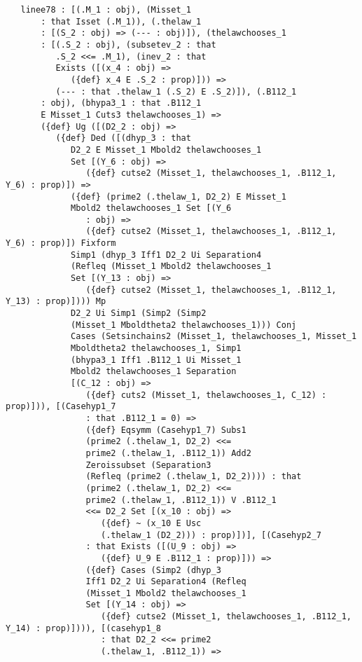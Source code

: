 \documentclass[12pt]{article}
\begin{document}
\begin{verbatim}
   linee78 : [(.M_1 : obj), (Misset_1 
       : that Isset (.M_1)), (.thelaw_1 
       : [(S_2 : obj) => (--- : obj)]), (thelawchooses_1 
       : [(.S_2 : obj), (subsetev_2 : that 
          .S_2 <<= .M_1), (inev_2 : that 
          Exists ([(x_4 : obj) => 
             ({def} x_4 E .S_2 : prop)])) => 
          (--- : that .thelaw_1 (.S_2) E .S_2)]), (.B112_1 
       : obj), (bhypa3_1 : that .B112_1 
       E Misset_1 Cuts3 thelawchooses_1) => 
       ({def} Ug ([(D2_2 : obj) => 
          ({def} Ded ([(dhyp_3 : that 
             D2_2 E Misset_1 Mbold2 thelawchooses_1 
             Set [(Y_6 : obj) => 
                ({def} cutse2 (Misset_1, thelawchooses_1, .B112_1, Y_6) : prop)]) => 
             ({def} (prime2 (.thelaw_1, D2_2) E Misset_1 
             Mbold2 thelawchooses_1 Set [(Y_6 
                : obj) => 
                ({def} cutse2 (Misset_1, thelawchooses_1, .B112_1, Y_6) : prop)]) Fixform 
             Simp1 (dhyp_3 Iff1 D2_2 Ui Separation4 
             (Refleq (Misset_1 Mbold2 thelawchooses_1 
             Set [(Y_13 : obj) => 
                ({def} cutse2 (Misset_1, thelawchooses_1, .B112_1, Y_13) : prop)]))) Mp 
             D2_2 Ui Simp1 (Simp2 (Simp2 
             (Misset_1 Mboldtheta2 thelawchooses_1))) Conj 
             Cases (Setsinchains2 (Misset_1, thelawchooses_1, Misset_1 
             Mboldtheta2 thelawchooses_1, Simp1 
             (bhypa3_1 Iff1 .B112_1 Ui Misset_1 
             Mbold2 thelawchooses_1 Separation 
             [(C_12 : obj) => 
                ({def} cuts2 (Misset_1, thelawchooses_1, C_12) : prop)])), [(Casehyp1_7 
                : that .B112_1 = 0) => 
                ({def} Eqsymm (Casehyp1_7) Subs1 
                (prime2 (.thelaw_1, D2_2) <<= 
                prime2 (.thelaw_1, .B112_1)) Add2 
                Zeroissubset (Separation3 
                (Refleq (prime2 (.thelaw_1, D2_2)))) : that 
                (prime2 (.thelaw_1, D2_2) <<= 
                prime2 (.thelaw_1, .B112_1)) V .B112_1 
                <<= D2_2 Set [(x_10 : obj) => 
                   ({def} ~ (x_10 E Usc 
                   (.thelaw_1 (D2_2))) : prop)])], [(Casehyp2_7 
                : that Exists ([(U_9 : obj) => 
                   ({def} U_9 E .B112_1 : prop)])) => 
                ({def} Cases (Simp2 (dhyp_3 
                Iff1 D2_2 Ui Separation4 (Refleq 
                (Misset_1 Mbold2 thelawchooses_1 
                Set [(Y_14 : obj) => 
                   ({def} cutse2 (Misset_1, thelawchooses_1, .B112_1, Y_14) : prop)]))), [(casehyp1_8 
                   : that D2_2 <<= prime2 
                   (.thelaw_1, .B112_1)) => 

\end{verbatim}
\end{document}
